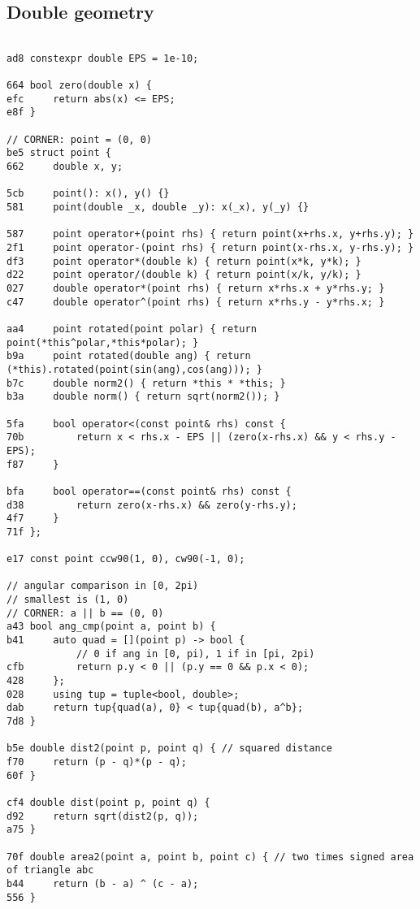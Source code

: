 \documentclass[11pt, a4paper, twoside]{article}
\begin{document}
\subsection{Double geometry}
\begin{lstlisting}

ad8 constexpr double EPS = 1e-10;

664 bool zero(double x) {
efc 	return abs(x) <= EPS;
e8f }

// CORNER: point = (0, 0)
be5 struct point {
662 	double x, y;
    	
5cb 	point(): x(), y() {}
581 	point(double _x, double _y): x(_x), y(_y) {}
    	
587 	point operator+(point rhs) { return point(x+rhs.x, y+rhs.y); }
2f1 	point operator-(point rhs) { return point(x-rhs.x, y-rhs.y); }
df3 	point operator*(double k) { return point(x*k, y*k); }
d22 	point operator/(double k) { return point(x/k, y/k); }
027 	double operator*(point rhs) { return x*rhs.x + y*rhs.y; }
c47 	double operator^(point rhs) { return x*rhs.y - y*rhs.x; }
    
aa4 	point rotated(point polar) { return point(*this^polar,*this*polar); }
b9a 	point rotated(double ang) { return (*this).rotated(point(sin(ang),cos(ang))); }
b7c 	double norm2() { return *this * *this; }
b3a 	double norm() { return sqrt(norm2()); }
    
5fa 	bool operator<(const point& rhs) const {
70b 		return x < rhs.x - EPS || (zero(x-rhs.x) && y < rhs.y - EPS);
f87 	}
    
bfa 	bool operator==(const point& rhs) const {
d38 		return zero(x-rhs.x) && zero(y-rhs.y);
4f7 	}
71f };

e17 const point ccw90(1, 0), cw90(-1, 0);

// angular comparison in [0, 2pi)
// smallest is (1, 0)
// CORNER: a || b == (0, 0)
a43 bool ang_cmp(point a, point b) {
b41 	auto quad = [](point p) -> bool {
    		// 0 if ang in [0, pi), 1 if in [pi, 2pi)
cfb 		return p.y < 0 || (p.y == 0 && p.x < 0);
428 	};
028 	using tup = tuple<bool, double>;
dab 	return tup{quad(a), 0} < tup{quad(b), a^b};
7d8 }

b5e double dist2(point p, point q) { // squared distance
f70     return (p - q)*(p - q);
60f }

cf4 double dist(point p, point q) {
d92     return sqrt(dist2(p, q));
a75 }

70f double area2(point a, point b, point c) { // two times signed area of triangle abc
b44 	return (b - a) ^ (c - a);
556 }


\end{lstlisting}
\end{document}
